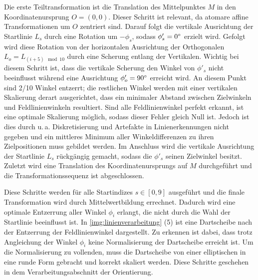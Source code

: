 Die erste Teiltransformation ist die Translation des Mittelpunktes $M$ in den Koordinatenursprung $O =(0, 0)$. Dieser Schritt ist relevant, da atomare affine Transformationen um $O$ zentriert sind. Darauf folgt die vertikale Ausrichtung der Startlinie $L_s$ durch eine Rotation um $-\phi_s$, sodass $\phi'_s = 0^{\circ}$ erzielt wird. Gefolgt wird diese Rotation von der horizontalen Ausrichtung der Orthogonalen $L_o = L_{(i+5) \mod 10}$ durch eine Scherung entlang der Vertikalen. Wichtig bei diesem Schritt ist, dass die vertikale Scherung den Winkel von $\phi'_s$ nicht beeinflusst während eine Ausrichtung $\phi'_o = 90^{\circ}$ erreicht wird. An diesem Punkt sind 2/10 Winkel entzerrt; die restlichen Winkel werden mit einer vertikalen Skalierung derart ausgerichtet, dass ein minimaler Abstand zwischen Zielwinkeln und Feldlinienwinkeln resultiert. Sind alle Feldlinienwinkel perfekt erkannt, ist eine optimale Skalierung möglich, sodass dieser Fehler gleich Null ist. Jedoch ist dies durch u.\,a. Diskretisierung und Artefakte in Linienerkennungen nicht gegeben und ein mittleres Minimum aller Winkeldifferenzen zu ihren Zielpositionen muss gebildet werden. Im Anschluss wird die vertikale Ausrichtung der Startlinie $L_s$ rückgängig gemacht, sodass die $\phi'_s$ seinen Zielwinkel besitzt. Zuletzt wird eine Translation des Koordinatenursprungs auf $M$ durchgeführt und die Transformationssequenz ist abgeschlossen.

Diese Schritte werden für alle Startindizes $s \in [0, 9]$ ausgeführt und die finale Transformation wird durch Mittelwertbildung errechnet. Dadurch wird eine optimale Entzerrung aller Winkel $\phi_i$ erlangt, die nicht durch die Wahl der Startlinie beeinflusst ist. In \autoref{img:linienverarbeitung} (5) ist eine Dartscheibe nach der Entzerrung der Feldlinienwinkel dargestellt. Zu erkennen ist dabei, dass trotz Angleichung der Winkel $\phi_i$ keine Normalisierung der Dartscheibe erreicht ist. Um die Normalisierung zu vollenden, muss die Dartscheibe von einer elliptischen in eine runde Form gebracht und korrekt skaliert werden. Diese Schritte geschehen in dem Verarbeitungsabschnitt der Orientierung.


